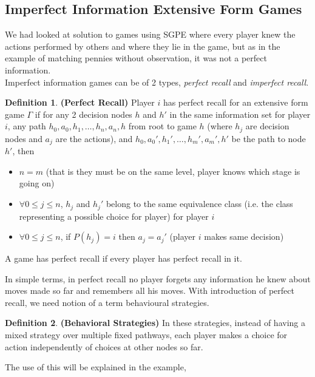 \documentclass{article}
\theoremstyle{definition}
\newtheorem{defn}{Definition}[section]
\begin{document}
\subsection{Imperfect Information Extensive Form Games}
We had looked at solution to games using SGPE where every player knew the actions performed by others and where they lie in the game, but as in the example of matching pennies without observation, it was not a perfect information.\\

Imperfect information games can be of 2 types, \textit{perfect recall} and \textit{imperfect recall}. 
\begin{defn}
\textbf{(Perfect Recall)} Player $i$ has perfect recall for an extensive form game $\Gamma$ if for any 2 decision nodes $h$ and $h'$ in the same information set for player $i$, any path $h_0,a_0,h_1,\dots,h_n,a_n,h$ from root to game $h$ (where $h_j$ are decision nodes and $a_j$ are the actions), and $h_0,a_0',h_1',\dots,h_m',a_m',h'$ be the path to node $h'$, then
\begin{itemize}
	\item $n = m$ (that is they must be on the same level, player knows which stage is going on)
	\item $\forall 0\leq j\leq n$, $h_j$ and $h_j'$ belong to the same equivalence class (i.e. the class representing a possible choice for player) for player $i$
	\item $\forall 0\leq j\leq n$, if $P(h_j)=i$ then $a_j = a_j'$ (player $i$ makes same decision)
\end{itemize}
A game has perfect recall if every player has perfect recall in it. 
\end{defn}
In simple terms, in perfect recall no player forgets any information he knew about moves made so far and remembers all his moves. With introduction of perfect recall, we need notion of a term behavioural strategies.
\begin{defn}
\textbf{(Behavioral Strategies)} In these strategies, instead of having a mixed strategy over multiple fixed pathways, each player makes a choice for action independently of choices at other nodes so far.
\end{defn}
The use of this will be explained in the example,\\
\end{document}
